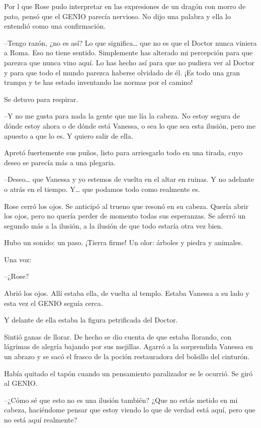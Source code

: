 Por l que Rose pudo interpretar en las expresiones de un dragón con
morro de pato, pensó que el GENIO parecía nervioso. No dijo una palabra
y ella lo entendió como una confirmación.

--Tengo razón, ¿no es así? Lo que significa\ldots{} que no es que el
Doctor nunca viniera a Roma. Eso no tiene sentido. Simplemente has
alterado mi percepción para que parezca que nunca vino aquí. Lo has
hecho así para que no pudiera ver al Doctor y para que todo el mundo
parezca haberse olvidado de él. ¡Es todo una gran trampa y te has estado
inventando las normas por el camino!

Se detuvo para respirar.

--Y no me gusta para nada la gente que me lía la cabeza. No estoy segura
de dónde estoy ahora o de dónde está Vanessa, o sea lo que sea esta
ilusión, pero me apuesto a que lo es. Y quiero salir de ella.

Apretó fuertemente sus puños, listo para arriesgarlo todo en una tirada,
cuyo deseo se parecía más a una plegaria.

--Deseo\ldots{} que Vanessa y yo estemos de vuelta en el altar en
ruinas. Y no adelante o atrás en el tiempo. Y\ldots{} que podamos todo
como realmente es.

Rose cerró los ojos. Se anticipó al trueno que resonó en su cabeza.
Quería abrir los ojos, pero no quería perder de momento todas sus
esperanzas. Se aferró un segundo más a la ilusión, a la ilusión de que
todo estaría otra vez bien.

Hubo un sonido: un paso. ¡Tierra firme! Un olor: árboles y piedra y
animales.

Una voz:

--¿Rose?

Abrió los ojos. Allí estaba ella, de vuelta al templo. Estaba Vanessa a
su lado y esta vez el GENIO seguía cerca.

Y delante de ella estaba la figura petrificada del Doctor.

Sintió ganas de llorar. De hecho se dio cuenta de que estaba llorando,
con lágrimas de alegría bajando por sus mejillas. Agarró a la
sorprendida Vanessa en un abrazo y se sacó el frasco de la poción
restauradora del bolsillo del cinturón.

Había quitado el tapón cuando un pensamiento paralizador se le ocurrió.
Se giró al GENIO.

--¿Cómo sé que esto no es una ilusión también? ¿Que no estás metido en
mi cabeza, haciéndome pensar que estoy viendo lo que de verdad está
aquí, pero que no está aquí realmente?

